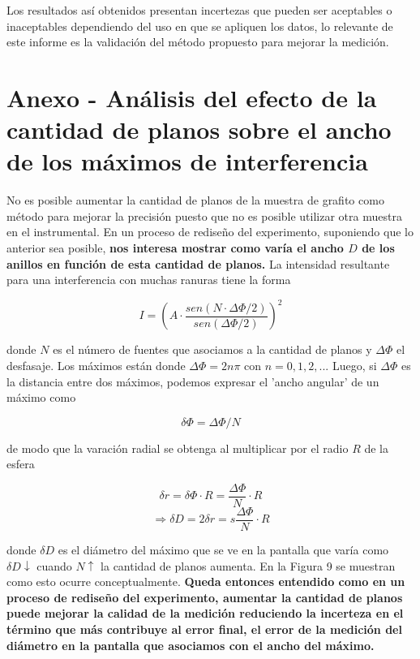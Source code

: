 \documentclass[a4paper, 10pt, spanish]{article}
\numberwithin{equation}{section}
\numberwithin{table}{section}
\begin{document}
Los resultados así obtenidos presentan incertezas que pueden ser aceptables o inaceptables dependiendo del uso en que se apliquen los datos, lo relevante de este informe es la validación del método propuesto para mejorar la medición.



\newpage
\section{Anexo - Análisis del efecto de la cantidad de planos sobre el ancho de los máximos de interferencia}

No es posible aumentar la cantidad de planos de la muestra de grafito como método para mejorar la precisión puesto que no es posible utilizar otra muestra en el instrumental. En un proceso de rediseño del experimento, suponiendo que lo anterior sea posible, \textbf{nos interesa mostrar como varía el ancho $D$ de los anillos en función de esta cantidad de planos.} La intensidad resultante para una interferencia con muchas ranuras tiene la forma 

\begin{equation}
I = (A \cdot \frac{sen(N\cdot \Delta \Phi/2)}{sen(\Delta \Phi/2)})^2
\end{equation}

donde $N$ es el número de fuentes que asociamos a la cantidad de planos y $\Delta \Phi$ el desfasaje. Los máximos están donde $\Delta \Phi = 2n\pi$ con $n = 0,1,2, ...$ Luego, si $\Delta \Phi$ es la distancia entre dos máximos, podemos expresar el 'ancho angular' de un máximo como

\begin{equation}
\delta \Phi = \Delta \Phi / N
\end{equation}

de modo que la varación radial se obtenga al multiplicar por el radio $R$ de la esfera

\begin{equation}
\delta r = \delta \Phi \cdot R = \frac{\Delta \Phi}{N} \cdot R 
\end{equation}
\begin{equation}
\Rightarrow \delta D = 2 \delta r = s \frac{\Delta \Phi}{N} \cdot R
\end{equation}

donde $\delta D$ es el diámetro del máximo que se ve en la pantalla que varía como $\delta D \downarrow$ cuando $N \uparrow$ la cantidad de planos aumenta. En la Figura 9 se muestran como esto ocurre conceptualmente. \textbf{Queda entonces entendido como en un proceso de rediseño del experimento, aumentar la cantidad de planos puede mejorar la calidad de la medición reduciendo la incerteza en el término que más contribuye al error final, el error de la medición del diámetro en la pantalla que asociamos con el ancho del máximo.}
\end{document}
